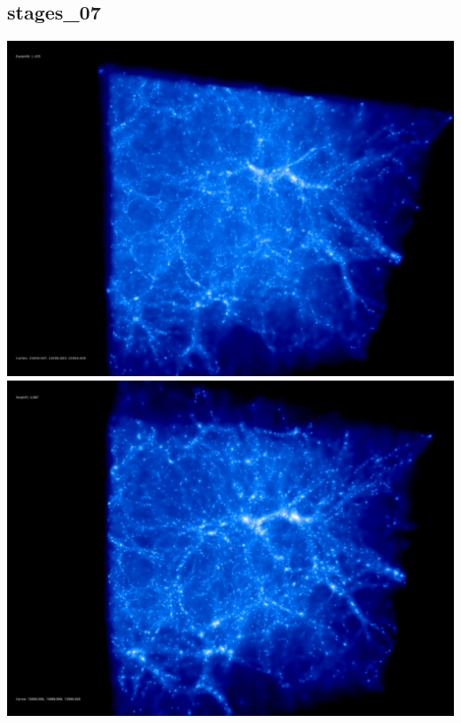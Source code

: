% 
%
%
%
%
%
%
%

\newpage
\subsection{stages\_07}

\includegraphics[scale=0.1]{r256/stages_07/50.jpg} 
\includegraphics[scale=0.1]{r256/stages_07/100.jpg}  \\

